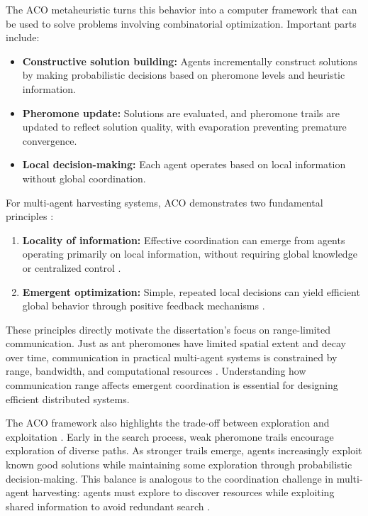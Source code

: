 The ACO metaheuristic turns this behavior into a computer framework that can be used to solve problems involving combinatorial optimization. Important parts include:

\begin{itemize}
    \item \textbf{Constructive solution building:} Agents incrementally construct solutions by making probabilistic decisions based on pheromone levels and heuristic information.
    \item \textbf{Pheromone update:} Solutions are evaluated, and pheromone trails are updated to reflect solution quality, with evaporation preventing premature convergence.
    \item \textbf{Local decision-making:} Each agent operates based on local information without global coordination.
\end{itemize}

For multi-agent harvesting systems, ACO demonstrates two fundamental principles \citep{dorigo2004ant}:

\begin{enumerate}
    \item \textbf{Locality of information:} Effective coordination can emerge from agents operating primarily on local information, without requiring global knowledge or centralized control \citep{cao1997cooperative}.
    \item \textbf{Emergent optimization:} Simple, repeated local decisions can yield efficient global behavior through positive feedback mechanisms \citep{bonabeau2002agent}.
\end{enumerate}

These principles directly motivate the dissertation's focus on range-limited communication. Just as ant pheromones have limited spatial extent and decay over time, communication in practical multi-agent systems is constrained by range, bandwidth, and computational resources \citep{parker2008multiple}. Understanding how communication range affects emergent coordination is essential for designing efficient distributed systems.

The ACO framework also highlights the trade-off between exploration and exploitation \citep{march1991exploration}. Early in the search process, weak pheromone trails encourage exploration of diverse paths. As stronger trails emerge, agents increasingly exploit known good solutions while maintaining some exploration through probabilistic decision-making. This balance is analogous to the coordination challenge in multi-agent harvesting: agents must explore to discover resources while exploiting shared information to avoid redundant search \citep{balch1998behavioral}.

